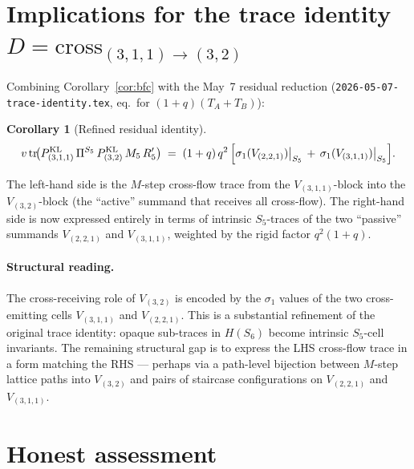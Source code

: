 \documentclass[11pt]{article}
\newtheorem{corollary}[theorem]{Corollary}
\theoremstyle{definition}
\begin{document}
\section{Implications for the trace identity $D = \mathrm{cross}_{(3,1,1)\to(3,2)}$}\label{sec:implications}

Combining Corollary~\ref{cor:bfc} with the May~7 residual reduction (\texttt{2026-05-07-trace-identity.tex}, eq.~for $(1+q)(T_A+T_B)$):

\begin{corollary}[Refined residual identity]\label{cor:refined-residual}
\[
v\,\mathrm{tr}\!\bigl(P_{(3,1,1)}^{\mathrm{KL}}\, \Pi^{S_5}\, P_{(3,2)}^{\mathrm{KL}}\, M_5\, R_5'\bigr)
\;=\;
(1+q)\,q^2\,\Bigl[\sigma_1(V_{(2,2,1)})\big|_{S_5} \,+\, \sigma_1(V_{(3,1,1)})\big|_{S_5}\Bigr].
\]
\end{corollary}

The left-hand side is the $M$-step cross-flow trace from the $V_{(3,1,1)}$-block into the $V_{(3,2)}$-block (the ``active'' summand that receives all cross-flow). The right-hand side is now expressed entirely in terms of intrinsic $S_5$-traces of the two ``passive'' summands $V_{(2,2,1)}$ and $V_{(3,1,1)}$, weighted by the rigid factor $q^2(1+q)$.

\paragraph{Structural reading.} The cross-receiving role of $V_{(3,2)}$ is encoded by the $\sigma_1$ values of the two cross-emitting cells $V_{(3,1,1)}$ and $V_{(2,2,1)}$. This is a substantial refinement of the original trace identity: opaque sub-traces in $H(S_6)$ become intrinsic $S_5$-cell invariants. The remaining structural gap is to express the LHS cross-flow trace in a form matching the RHS — perhaps via a path-level bijection between $M$-step lattice paths into $V_{(3,2)}$ and pairs of staircase configurations on $V_{(2,2,1)}$ and $V_{(3,1,1)}$.

\section{Honest assessment}\label{sec:honest}
\end{document}
